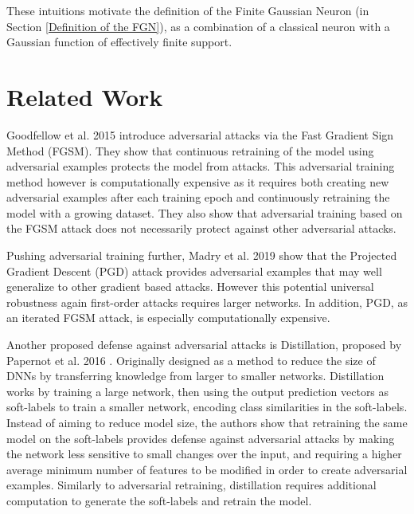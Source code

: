\documentclass[12pt,oneside]{CUNY_PhD}
\begin{document}
These intuitions motivate the definition of the Finite Gaussian Neuron (in Section \ref{Definition of the FGN}), as a combination of a classical neuron with a Gaussian function of effectively finite support. 


\section{Related Work}
Goodfellow et al. 2015 \cite{goodfellow2015explaining} introduce adversarial attacks via the Fast Gradient Sign Method (FGSM). They show that continuous retraining of the model using adversarial examples protects the model from attacks. This adversarial training method however is computationally expensive as it requires both creating new adversarial examples after each training epoch and continuously retraining the model with a growing dataset. They also show that adversarial training based on the FGSM attack does not necessarily protect against other adversarial attacks.
\newpage %

Pushing adversarial training further, Madry et al. 2019 \cite{madry2019deep} show that the Projected Gradient Descent (PGD) attack provides adversarial examples that may well generalize to other gradient based attacks. However this potential universal robustness again first-order attacks requires larger networks. In addition, PGD, as an iterated FGSM attack, is especially computationally expensive.

Another proposed defense against adversarial attacks is Distillation, proposed by Papernot et al. 2016 \cite{Papernot2016DistillationAA}. Originally designed as a method to reduce the size of DNNs by transferring knowledge from larger to smaller networks. Distillation works by training a large network, then using the output prediction vectors as soft-labels to train a smaller network, encoding class similarities in the soft-labels. Instead of aiming to reduce model size, the authors show that retraining the same model on the soft-labels provides defense against adversarial attacks by making the network less sensitive to small changes over the input, and requiring a higher average minimum
number of features to be modified in order to create adversarial examples. Similarly to adversarial retraining, distillation requires additional computation to generate the soft-labels and retrain the model.
\end{document}
